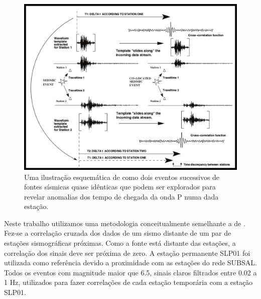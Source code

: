 \begin{figure}[!ht]
\centering
\includegraphics[scale=0.6]{Figs/correlacao_tempo_de_chegada.png}
\caption[Uma ilustração esquemática mostrando a correlação dos tempos de chegada da onda P.]{Uma ilustração esquemática de como dois eventos sucessivos de fontes sísmicas quase idênticas que podem ser explorados para revelar anomalias dos tempo de chegada da onda P numa dada estação. \cite{gibbons_identification_2006}}
\label{teste_tempo}
\end{figure}

Neste trabalho utilizamos uma metodologia conceitualmente semelhante a de \cite{gibbons_identification_2006}. Fez-se a correlação cruzada dos dados de um sismo distante de um par de estações sismográficas próximas. Como a fonte está distante das estações, a correlação dos sinais deve ser próxima de zero. A estação permanente SLP01 foi utilizada como referência devido a proximidade com as estações do rede SUBSAL. Todos os eventos com magnitude maior que 6.5, sinais claros filtrados entre 0.02 a 1 Hz, utilizados para fazer correlações de cada estação temporária com a estação SLP01.

